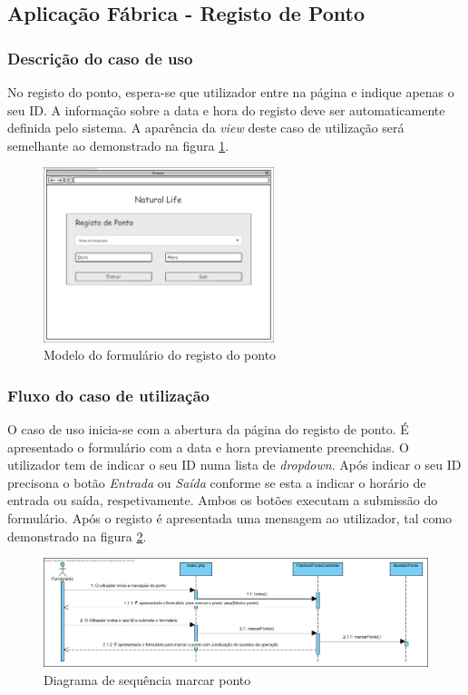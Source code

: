 \subsection{Aplicação Fábrica - Registo de Ponto}
\subsubsection*{Descrição do caso de uso}
No registo do ponto, espera-se que utilizador entre na página e indique apenas o seu ID. A informação sobre a data e hora do registo deve ser automaticamente definida pelo sistema. A aparência da \textit{view} deste caso de utilização será semelhante ao demonstrado na figura \ref{fig:di_ponto}. 

\begin{figure}[H] 
	\begin{center}
		\includegraphics[width=0.60\textwidth,keepaspectratio]{figuras/Diagramas_vp/DI_Fabrica_1_Marcar_Ponto.jpg}
		\caption{Modelo do formulário do registo do ponto}
		\label{fig:di_ponto} 
	\end{center}
\end{figure}

\subsubsection*{Fluxo do caso de utilização}
O caso de uso inicia-se com a abertura da página do registo de ponto. É apresentado o formulário com a data e hora previamente preenchidas. O utilizador tem de indicar o seu ID numa lista de \textit{dropdown}. Após indicar o seu ID precisona o botão \textit{Entrada} ou \textit{Saída} conforme se esta a indicar o horário de entrada ou saída, respetivamente. Ambos os botões executam a submissão do formulário. Após o registo é apresentada uma mensagem ao utilizador, tal como demonstrado na figura \ref{fig:sd_ponto}.


\begin{figure}[H] 
	\begin{center}
		\includegraphics[width=\textwidth,keepaspectratio]{figuras/Diagramas_vp/SD_Fabrica_1_Marcar_Ponto.jpg}
		\caption{Diagrama de sequência marcar ponto}
		\label{fig:sd_ponto} 
	\end{center}
\end{figure}